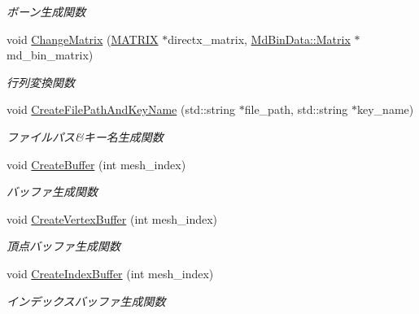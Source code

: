 \begin{DoxyCompactItemize}
\begin{DoxyCompactList}\small\item\em ボーン生成関数 \end{DoxyCompactList}\item 
void \mbox{\hyperlink{class_md_bin_object_a59d4f0131952b4efbd169275a3aae7e3}{Change\+Matrix}} (\mbox{\hyperlink{_matrix_8h_a032295cd9fb1b711757c90667278e744}{M\+A\+T\+R\+IX}} $\ast$directx\+\_\+matrix, \mbox{\hyperlink{class_md_bin_data_1_1_matrix}{Md\+Bin\+Data\+::\+Matrix}} $\ast$md\+\_\+bin\+\_\+matrix)
\begin{DoxyCompactList}\small\item\em 行列変換関数 \end{DoxyCompactList}\item 
void \mbox{\hyperlink{class_md_bin_object_a6f4839e94a7fc3a8c91085e17d2525df}{Create\+File\+Path\+And\+Key\+Name}} (std\+::string $\ast$file\+\_\+path, std\+::string $\ast$key\+\_\+name)
\begin{DoxyCompactList}\small\item\em ファイルパス\&キー名生成関数 \end{DoxyCompactList}\item 
void \mbox{\hyperlink{class_md_bin_object_a717dc0ad02050305cb3bf5ee7b6d3475}{Create\+Buffer}} (int mesh\+\_\+index)
\begin{DoxyCompactList}\small\item\em バッファ生成関数 \end{DoxyCompactList}\item 
void \mbox{\hyperlink{class_md_bin_object_a51a4cb4fa54cd2dd8b47428c3bc54f94}{Create\+Vertex\+Buffer}} (int mesh\+\_\+index)
\begin{DoxyCompactList}\small\item\em 頂点バッファ生成関数 \end{DoxyCompactList}\item 
void \mbox{\hyperlink{class_md_bin_object_aab92346bd78c7e35f3becb5668c1d94e}{Create\+Index\+Buffer}} (int mesh\+\_\+index)
\begin{DoxyCompactList}\small\item\em インデックスバッファ生成関数 \end{DoxyCompactList}\end{DoxyCompactItemize}

